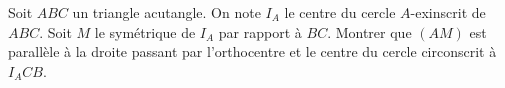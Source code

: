 Soit $ABC$ un triangle acutangle. On note $I_A$ le centre du cercle $A$-exinscrit de $ABC$. Soit $M$ le symétrique de $I_A$ par rapport à $BC$. Montrer que $(AM)$ est parallèle à la droite passant par l'orthocentre et le centre du cercle circonscrit à $I_ACB$.